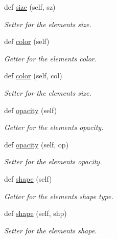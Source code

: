 \begin{DoxyCompactItemize}
def \mbox{\hyperlink{classbridges_1_1element_1_1_element_afbb37ab4474c2ac1b7da950fb06819ed}{size}} (self, sz)
\begin{DoxyCompactList}\small\item\em Setter for the element\textquotesingle{}s size. \end{DoxyCompactList}\item 
def \mbox{\hyperlink{classbridges_1_1element_1_1_element_af8bf34079130638064db0b03ef5bb79a}{color}} (self)
\begin{DoxyCompactList}\small\item\em Getter for the element\textquotesingle{}s color. \end{DoxyCompactList}\item 
def \mbox{\hyperlink{classbridges_1_1element_1_1_element_ace59b1eb4cf0d775e9afa31605183c50}{color}} (self, col)
\begin{DoxyCompactList}\small\item\em Setter for the element\textquotesingle{}s size. \end{DoxyCompactList}\item 
def \mbox{\hyperlink{classbridges_1_1element_1_1_element_a31ce56c32bd400a2d8d0e7e146c4b5f3}{opacity}} (self)
\begin{DoxyCompactList}\small\item\em Getter for the element\textquotesingle{}s opacity. \end{DoxyCompactList}\item 
def \mbox{\hyperlink{classbridges_1_1element_1_1_element_a1542425770b360b39369e3db7116d6ae}{opacity}} (self, op)
\begin{DoxyCompactList}\small\item\em Setter for the element\textquotesingle{}s opacity. \end{DoxyCompactList}\item 
def \mbox{\hyperlink{classbridges_1_1element_1_1_element_a4485e4854639bcb163a36d0629f0e8f9}{shape}} (self)
\begin{DoxyCompactList}\small\item\em Getter for the element\textquotesingle{}s shape type. \end{DoxyCompactList}\item 
def \mbox{\hyperlink{classbridges_1_1element_1_1_element_a54d45aa4c09c0b5745cebbabcc0c02f9}{shape}} (self, shp)
\begin{DoxyCompactList}\small\item\em Setter for the element\textquotesingle{}s shape. \end{DoxyCompactList}\item 

\end{DoxyCompactItemize}
